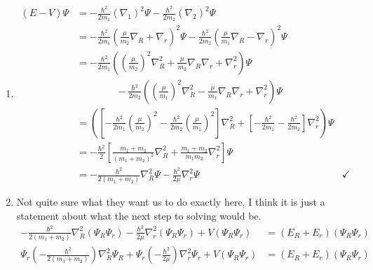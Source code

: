 \documentclass[11pt]{article}
\begin{document}
\begin{enumerate}[label=\alph*)]
\item 
\begin{align*}
(E-V)\Psi & = - \frac{\hbar^2}{2m_1}\left(\nabla_1 \right)^2 \Psi - \frac{\hbar^2}{2m_2}\left(\nabla_2\right)^2 \Psi\\
& = -\frac{\hbar^2}{2m_1}\left(\frac{\mu}{m_2}\nabla_R + \nabla_r\right)^2\Psi -\frac{\hbar^2}{2m_2}\left(\frac{\mu}{m_1}\nabla_R - \nabla_r\right)^2\Psi \\
& = -\frac{\hbar^2}{2m_1}\left(\left(\frac{\mu}{m_2}\right)^2\nabla_R^2 + \frac{\mu}{m_2}\nabla_R \nabla_r + \nabla_r^2\right)\Psi \\
& \hspace{4em} -\frac{\hbar^2}{2m_2}\left(\left(\frac{\mu}{m_1}\right)^2\nabla_R^2 - \frac{\mu}{m_1}\nabla_R \nabla_r + \nabla_r^2\right)\Psi\\
& = \left(\left[-\frac{\hbar^2}{2m_1}\left(\frac{\mu}{m_2}\right)^2-\frac{\hbar^2}{2m_2}\left(\frac{\mu}{m_1}\right)^2\right]\nabla_R^2 + \left[-\frac{\hbar^2}{2m_1}-\frac{\hbar^2}{2m_2}\right]\nabla_r^2\right)\Psi\\
& = -\frac{\hbar^2}{2}\left[\frac{m_1+m_2}{(m_1 + m_2)^2}\nabla_R^2 + \frac{m_1+m_2}{m_1m_2}\nabla_r^2\right]\Psi\\
& = -\frac{\hbar^2}{2(m_1+m_2)}\nabla_R^2\Psi - \frac{\hbar^2}{2\mu}\nabla_r^2\Psi & \checkmark
\end{align*}

\item Not quite sure what they want us to do exactly here, I think it is just a statement about what the next step to solving would be. 
\begin{align*}
-\frac{\hbar^2}{2(m_1+m_2)}\nabla_R^2(\Psi_R\Psi_r) - \frac{\hbar^2}{2\mu}\nabla_r^2 (\Psi_R\Psi_r) + V(\Psi_R\Psi_r) & = (E_R+E_r) (\Psi_R\Psi_r)\\
\Psi_r\left(-\frac{\hbar^2}{2(m_1+m_2)}\right)\nabla_R^2 \Psi_R + \Psi_r \left(-\frac{\hbar^2}{2\mu}\right)\nabla_r^2 \Psi_r + V(\Psi_R\Psi_r) & = (E_R+E_r) (\Psi_R\Psi_r)
\end{align*}
\end{enumerate}

\newpage
\end{document}
